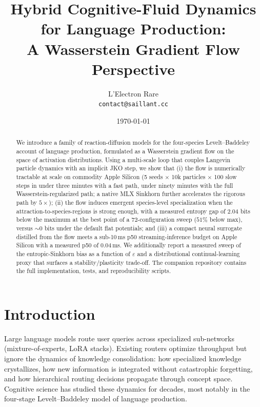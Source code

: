 \documentclass[11pt]{article}
\title{Hybrid Cognitive-Fluid Dynamics for Language Production: \\
       A Wasserstein Gradient Flow Perspective}
\author{L'Electron Rare \\ \texttt{contact@saillant.cc}}
\date{\today}
\begin{document}
\maketitle

\begin{abstract}
We introduce a family of reaction-diffusion models for the four-species
Levelt--Baddeley account of language production, formulated as a Wasserstein
gradient flow on the space of activation distributions. Using a multi-scale
loop that couples Langevin particle dynamics with an implicit JKO step,
we show that (i) the flow is numerically tractable at scale on commodity
Apple Silicon (5 seeds $\times$ 10k particles $\times$ 100 slow steps in
under three minutes with a fast path, under ninety minutes with the full
Wasserstein-regularized path; a native MLX Sinkhorn further accelerates
the rigorous path by $5\times$); (ii) the flow induces emergent
species-level specialization when the attraction-to-species-regions is
strong enough, with a measured entropy gap of $2.04$ bits below the
maximum at the best point of a 72-configuration sweep ($51\%$ below max),
versus $\sim\!0$ bits under the default flat potentials; and (iii) a
compact neural surrogate distilled from the flow meets a sub-10\,ms p50
streaming-inference budget on Apple Silicon with a measured p50 of
$0.04$\,ms. We additionally report a measured sweep of the
entropic-Sinkhorn bias as a function of $\varepsilon$ and a distributional
continual-learning proxy that surfaces a stability/plasticity trade-off.
The companion repository contains the full implementation, tests, and
reproducibility scripts.
\end{abstract}

\section{Introduction}
\label{sec:intro}

Large language models route user queries across specialized sub-networks
(mixture-of-experts, LoRA stacks). Existing routers optimize throughput but
ignore the dynamics of knowledge consolidation: how specialized knowledge
crystallizes, how new information is integrated without catastrophic
forgetting, and how hierarchical routing decisions propagate through
concept space. Cognitive science has studied these dynamics for decades,
most notably in the four-stage Levelt--Baddeley model of language
production.
\end{document}
